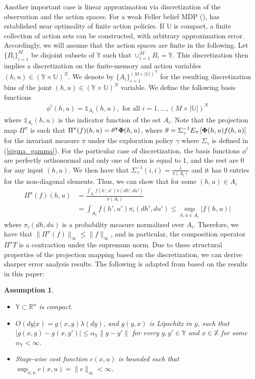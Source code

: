 \documentclass[letterpaper, 10 pt, conference]{ieeeconf}  %
\newtheorem{assumption}{Assumption}
\theoremstyle{definition}
\theoremstyle{remark}
\begin{document}
Another important case is linear approximation via discretization of the observation and the action spaces. For a weak Feller belief MDP (\cite{FeKaZa12, KSYWeakFellerSysCont}), \cite[Theorem 3.16]{SaLiYuSpringer}  has established near optimality of finite action policies. If $\mathds{U}$ is compact, a finite collection of action sets can be constructed, with arbitrary approximation error. Accordingly, we will assume that the action spaces are finite in the following. Let $\{B_i\}_{i=1}^{M}$ be disjoint subsets of $\mathds{Y}$ such that $\cup_{i=1}^{M}B_i=\mathds{Y}$. This discretization then implies a discretization on the finite-memory and action variables $(h,u)\in(\mathds{Y\times U})^N$.
We denote by $\{A_i\}_{i=1}^{(M\times |\mathds{U}|)^N}$ for the resulting discretization bins of the joint $(h,u)\in(\mathds{Y\times U})^N$ variable.
We define the following basis functions 
\begin{align*}
\phi^i(h,u)=\mathds{1}_{A_i}(h,u), \text{ for all } i=1,\dots, (M\times |\mathds{U}|)^N
\end{align*}
where $\mathds{1}_{A_i}(h,u)$ is the indicator function of the set $A_i$. Note that the projection map $\Pi^\pi$ is such that $\Pi^\pi(f)(h,u)=\theta^\intercal {\bf \Phi}(h,u)$, where $\theta=\Sigma^{-1}_\gamma E_{\pi}\left[ {\bf \Phi}(h,u)f(h,u)\right]$
for the invariant measure $\pi$ under the exploration policy $\gamma$ where $\Sigma_\gamma$ is defined in (\ref{sigma_gamma}). For the particular case of discretization, the basis functions $\phi^i$ are perfectly orthonormal and only one of them is equal to 1, and the rest are 0 for any input $(h,u)$. We then have that $
\Sigma^{-1}_\gamma(i,i)=\frac{1}{\pi(A_i)}
$
and it has $0$ entries for the non-diagonal elements. Thus, we can show that for some $(h,u)\in A_i$ 
\begin{align*}
\Pi^\pi(f)(h,u) &= \frac{\int_{A_i} f(h',u')\pi(dh',du')}{\pi(A_i)}\\
&=\int_{A_i} f(h',u')\pi_i(dh',du')\leq \sup_{h,u\in A_i} |f(h,u)|
\end{align*}
where $\pi_i(dh,du)$ is a probability measure normalized over $A_i$. Therefore, we have that $\|\Pi^\pi(f)\|_\infty\leq \|f\|_\infty$, and in particular,  the composition operator $\Pi^\pi T$ is a contraction under the supremum norm.  Due to these structural properties of the projection mapping based on the discretization, we can derive sharper error analysis results. The following is adapted from   \cite{devran2025near} based on the results in this paper:
\begin{assumption}\label{main_assmp}
\begin{itemize}
\item {$\mathds{Y}\subset\mathds{R}^n$} is compact.
\item $O(dy|x)=g(x,y)\lambda(dy)$, and $g(y,x)$ is Lipschitz in $y$, such that $|g(x,y)-g(x,y')|\leq\alpha_{\mathds{Y}} \|y-y'\|$ for every $y,y'\in\mathds{Y}$ and $x\in\mathds{X}$ for some $\alpha_{\mathds{Y}}<\infty$.
\item Stage-wise cost function $c(x,u)$ is bounded such that $\sup_{x,u}c(x,u)=\|c\|_\infty<\infty$.
\end{itemize}
\end{assumption}
\end{document}
